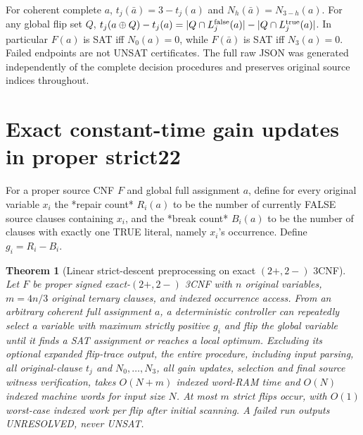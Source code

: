 \documentclass[10pt]{article}
\newtheorem{theorem}{Theorem}
\begin{document}
For coherent complete $a$, $t_j(\bar a)=3-t_j(a)$ and $N_h(\bar a)=N_{3-h}(a)$. For any global flip set $Q$, $t_j(a\oplus Q)-t_j(a)=|Q\cap L_j^{\rm false}(a)|-|Q\cap L_j^{\rm true}(a)|$. In particular $F(a)$ is SAT iff $N_0(a)=0$, while $F(\bar a)$ is SAT iff $N_3(a)=0$. Failed endpoints are not UNSAT certificates. The full raw JSON was generated independently of the complete decision procedures and preserves original source indices throughout.

\section*{Exact constant-time gain updates in proper strict22}
For a proper source CNF $F$ and global full assignment $a$, define for every original variable $x_i$ the *repair count* $R_i(a)$ to be the number of currently FALSE source clauses containing $x_i$, and the *break count* $B_i(a)$ to be the number of clauses with exactly one TRUE literal, namely $x_i$'s occurrence. Define $g_i=R_i-B_i$.
\begin{theorem}[Linear strict-descent preprocessing on exact $(2+,2-)$ 3CNF]
Let $F$ be proper signed exact-$(2+,2-)$ 3CNF with $n$ original variables, $m=4n/3$ original ternary clauses, and indexed occurrence access. From an arbitrary coherent full assignment $a$, a deterministic controller can repeatedly select a variable with \emph{maximum strictly positive} $g_i$ and flip the global variable until it finds a SAT assignment or reaches a local optimum. Excluding its optional expanded flip-trace output, the entire procedure, including input parsing, all original-clause $t_j$ and $N_0,\dots,N_3$, all gain updates, selection and final source witness verification, takes $O(N+m)$ indexed word-RAM time and $O(N)$ indexed machine words for input size $N$. At most $m$ strict flips occur, with $O(1)$ worst-case indexed work per flip after initial scanning. A failed run outputs UNRESOLVED, never UNSAT.
\end{theorem}
\end{document}
